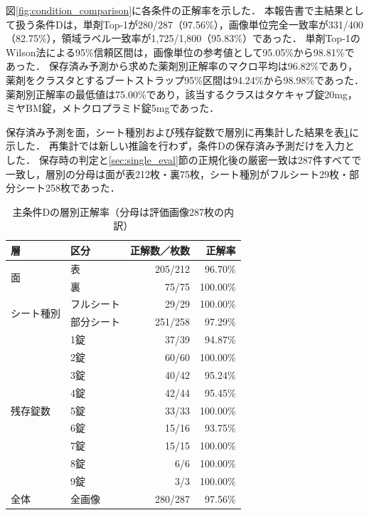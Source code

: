 \documentclass[uplatex,dvipdfmx]{jsarticle}
\begin{document}
図\ref{fig:condition_comparison}に各条件の正解率を示した．
本報告書で主結果として扱う条件Dは，単剤Top-1が280/287（97.56\%），画像単位完全一致率が331/400（82.75\%），領域ラベル一致率が1,725/1,800（95.83\%）であった．
単剤Top-1のWilson法による95\%信頼区間は，画像単位の参考値として95.05\%から98.81\%であった．
保存済み予測から求めた薬剤別正解率のマクロ平均は96.82\%であり，薬剤をクラスタとするブートストラップ95\%区間は94.24\%から98.98\%であった．
薬剤別正解率の最低値は75.00\%であり，該当するクラスはタケキャブ錠20mg，ミヤBM錠，メトクロプラミド錠5mgであった．

保存済み予測を面，シート種別および残存錠数で層別に再集計した結果を表\ref{tab:condition_d_stratified}に示した．
再集計では新しい推論を行わず，条件Dの保存済み予測だけを入力とした．
保存時の判定と\ref{sec:single_eval}節の正規化後の厳密一致は287件すべてで一致し，層別の分母は面が表212枚・裏75枚，シート種別がフルシート29枚・部分シート258枚であった．

\begin{table}[H]
  \centering
  \caption{主条件Dの層別正解率（分母は評価画像287枚の内訳）}
  \label{tab:condition_d_stratified}
  \small
  \begin{tabular}{|l|l|r|r|}
    \hline
    層 & 区分 & 正解数／枚数 & 正解率 \\ \hline
    \multirow{2}{*}{面} & 表 & 205/212 & 96.70\% \\ \cline{2-4}
     & 裏 & 75/75 & 100.00\% \\ \hline
    \multirow{2}{*}{シート種別} & フルシート & 29/29 & 100.00\% \\ \cline{2-4}
     & 部分シート & 251/258 & 97.29\% \\ \hline
    \multirow{9}{*}{残存錠数} & 1錠 & 37/39 & 94.87\% \\ \cline{2-4}
     & 2錠 & 60/60 & 100.00\% \\ \cline{2-4}
     & 3錠 & 40/42 & 95.24\% \\ \cline{2-4}
     & 4錠 & 42/44 & 95.45\% \\ \cline{2-4}
     & 5錠 & 33/33 & 100.00\% \\ \cline{2-4}
     & 6錠 & 15/16 & 93.75\% \\ \cline{2-4}
     & 7錠 & 15/15 & 100.00\% \\ \cline{2-4}
     & 8錠 & 6/6 & 100.00\% \\ \cline{2-4}
     & 9錠 & 3/3 & 100.00\% \\ \hline
    全体 & 全画像 & 280/287 & 97.56\% \\ \hline
  \end{tabular}
\end{table}
\end{document}
